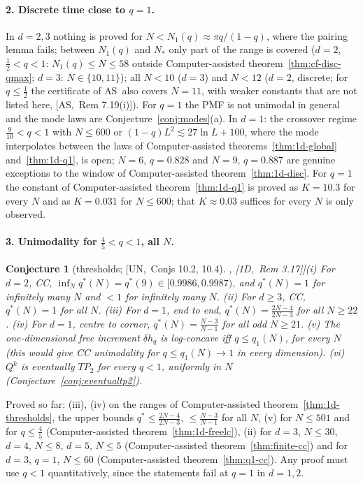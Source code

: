 \documentclass[10pt,a4paper]{article}
\theoremstyle{plain}
\newtheorem{conjecture}[theorem]{Conjecture}
\theoremstyle{definition}
\newcommand{\src}[2]{[\textsf{#1},~#2]}           %
\newcommand{\ONE}{\textsf{1D}}
\newcommand{\ASY}{\textsf{AS}}
\newcommand{\UNI}{\textsf{UN}}
\begin{document}
\paragraph{2. Discrete time close to $q=1$.} In $d=2,3$ nothing is proved for $N<N_1(q)\approx\pi q/(1-q)$, where the pairing lemma fails; between $N_1(q)$ and $N_*$ only part of the range is covered ($d=2$, $\frac12<q<1$: $N_1(q)\le N\le58$ outside Computer-assisted theorem~\ref{thm:cf-disc-qmax}; $d=3$: $N\in\{10,11\}$); all $N<10$ ($d=3$) and $N<12$ ($d=2$, discrete; for $q\le\frac12$ the certificate of \ASY\ also covers $N=11$, with weaker constants that are not listed here, \src{\ASY}{Rem 7.19(i)}). For $q=1$ the PMF is not unimodal in general and the mode laws are Conjecture~\ref{conj:modes}(a). In $d=1$: the crossover regime $\frac9{10}<q<1$ with $N\le600$ or $(1-q)L^2\lesssim27\ln L+100$, where the mode interpolates between the laws of Computer-assisted theorems~\ref{thm:1d-global} and~\ref{thm:1d-q1}, is open; $N=6$, $q=0.828$ and $N=9$, $q=0.887$ are genuine exceptions to the window of Computer-assisted theorem~\ref{thm:1d-disc}. For $q=1$ the constant of Computer-assisted theorem~\ref{thm:1d-q1} is proved as $K=10.3$ for every $N$ and as $K=0.031$ for $N\le600$; that $K\approx0.03$ suffices for every $N$ is only observed.

\paragraph{3. Unimodality for $\frac45<q<1$, all $N$.}
\begin{conjecture}[thresholds; \src{\UNI}{Conjs 10.2, 10.4}, \src{\ONE}{Rem 3.17}]\label{conj:thresholds}
(i) For $d=2$, CC, $\inf_Nq^*(N)=q^*(9)\in[0.9986,0.9987)$, and $q^*(N)=1$ for infinitely many $N$ and $<1$ for infinitely many $N$. (ii) For $d\ge3$, CC, $q^*(N)=1$ for all $N$. (iii) For $d=1$, end to end, $q^*(N)=\frac{2N-4}{2N-3}$ for all $N\ge22$. (iv) For $d=1$, centre to corner, $q^*(N)=\frac{N-3}{N-1}$ for all odd $N\ge21$. (v) The one-dimensional free increment $\delta h_q$ is log-concave iff $q\le q_1(N)$, for every $N$ (this would give CC unimodality for $q\le q_1(N)\to1$ in every dimension). (vi) $Q^k$ is eventually $TP_2$ for every $q<1$, uniformly in $N$ (Conjecture~\ref{conj:eventualtp2}).
\end{conjecture}
Proved so far: (iii), (iv) on the ranges of Computer-assisted theorem~\ref{thm:1d-thresholds}, the upper bounds $q^*\le\frac{2N-4}{2N-3}$, $\le\frac{N-3}{N-1}$ for all $N$, (v) for $N\le501$ and for $q\le\frac45$ (Computer-assisted theorem~\ref{thm:1d-freelc}), (ii) for $d=3$, $N\le30$, $d=4$, $N\le8$, $d=5$, $N\le5$ (Computer-assisted theorem~\ref{thm:finite-cc}) and for $d=3$, $q=1$, $N\le60$ (Computer-assisted theorem~\ref{thm:q1-cc}). Any proof must use $q<1$ quantitatively, since the statements fail at $q=1$ in $d=1,2$.
\end{document}
